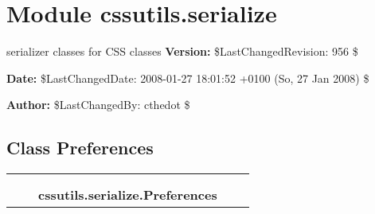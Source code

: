%
%
%


\section{Module cssutils.serialize}

    \label{cssutils:serialize}

serializer classes for CSS classes
\textbf{Version:} \$LastChangedRevision: 956 \$



\textbf{Date:} \$LastChangedDate: 2008-01-27 18:01:52 +0100 (So, 27 Jan 2008) \$



\textbf{Author:} \$LastChangedBy: cthedot \$





\subsection{Class Preferences}

    \label{cssutils:serialize:Preferences}
\begin{tabular}{cccccc}
\multicolumn{2}{r}{\settowidth{\BCL}{object}\multirow{2}{\BCL}{object}}
&&
  \\\cline{3-3}
  &&\multicolumn{1}{c|}{}
&&
  \\
&&\multicolumn{2}{l}{\textbf{cssutils.serialize.Preferences}}
\end{tabular}


